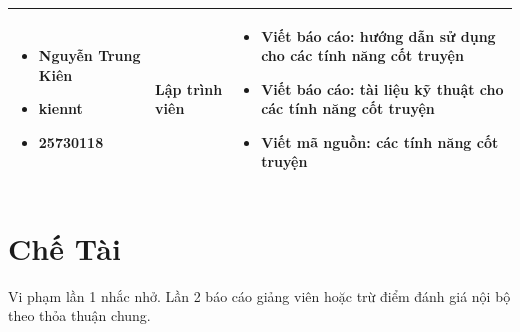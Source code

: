 \documentclass[12pt,a4paper]{article}
\begin{document}
\begin{table}[H]
\begin{tabularx}{\textwidth}{|m{3.5cm}|m{2.5cm}|>{\arraybackslash}X|}
\begin{itemize}[leftmargin=*, nosep, before=\vspace{4pt}, after=\vspace{4pt}]
    \item Nguyễn Trung Kiên
    \item kiennt
    \item 25730118
\end{itemize} & Lập trình viên & 
\begin{itemize}[leftmargin=*, nosep, before=\vspace{4pt}, after=\vspace{4pt}]
    \item Viết báo cáo: hướng dẫn sử dụng cho các tính năng cốt truyện
    \item Viết báo cáo: tài liệu kỹ thuật cho các tính năng cốt truyện
    \item Viết mã nguồn: các tính năng cốt truyện
\end{itemize} \\ \hline

\end{tabularx}
\end{table}

\section{Chế Tài}
Vi phạm lần 1 nhắc nhở. Lần 2 báo cáo giảng viên hoặc trừ điểm đánh giá nội bộ theo thỏa thuận chung.
\end{document}
